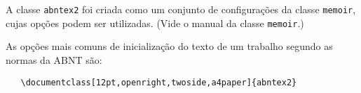 %

A classe \texttt{abntex2} foi criada como um conjunto de configurações da classe
\texttt{memoir}, cujas opções podem ser utilizadas. (Vide o manual da classe \texttt{memoir}.)


As opções mais comuns de inicialização do texto de um trabalho segundo as normas da ABNT são:

\begin{verbatim}
   \documentclass[12pt,openright,twoside,a4paper]{abntex2}
\end{verbatim} 

